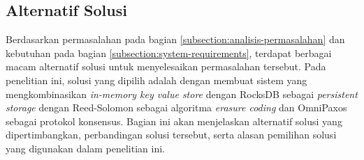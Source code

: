 \subsection{Alternatif Solusi}
\label{subsection:alternatif-solusi}

Berdasarkan permasalahan pada bagian \ref{subsection:analisis-permasalahan} dan kebutuhan pada bagian \ref{subsection:system-requirements}, terdapat berbagai macam alternatif solusi untuk menyelesaikan permasalahan tersebut. Pada penelitian ini, solusi yang dipilih adalah dengan membuat sistem yang mengkombinasikan \textit{in-memory key value store} dengan RocksDB sebagai \textit{persistent storage} dengan Reed-Solomon sebagai algoritma \textit{erasure coding} dan OmniPaxos sebagai protokol konsensus. Bagian ini akan menjelaskan alternatif solusi yang dipertimbangkan, perbandingan solusi tersebut, serta alasan pemilihan solusi yang digunakan dalam penelitian ini.





